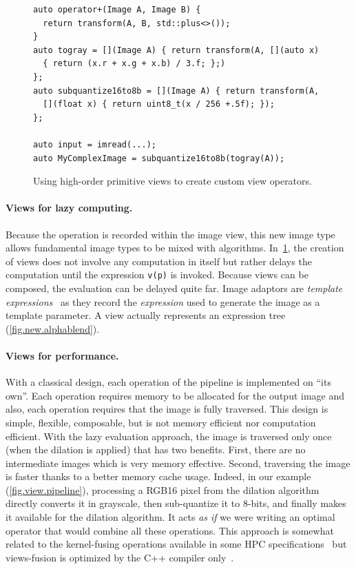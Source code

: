 \begin{figure}
  \begin{verbatim}
auto operator+(Image A, Image B) {
  return transform(A, B, std::plus<>());
}
auto togray = [](Image A) { return transform(A, [](auto x)
  { return (x.r + x.g + x.b) / 3.f; };)
};
auto subquantize16to8b = [](Image A) { return transform(A,
  [](float x) { return uint8_t(x / 256 +.5f); });
};

auto input = imread(...);
auto MyComplexImage = subquantize16to8b(togray(A));
  \end{verbatim}

  \caption{Using high-order primitive views to create custom view operators.}
  \label{fig.view.highorder}
\end{figure}

\paragraph{Views for lazy computing.} Because the operation is recorded within the image view, this new image type
allows fundamental image types to be mixed with algorithms. In~\cref{fig.view.highorder}, the creation of views does not
involve any computation in itself but rather delays the computation until the expression \texttt{v(p)} is invoked.
Because views can be composed, the evaluation can be delayed quite far. Image adaptors are \emph{template
  expressions}~\parencite{veldhuizen.1995.expression, veldhuizen.2000.blitz} as they record the \emph{expression} used to
generate the image as a template parameter. A view actually represents an expression tree (\cref{fig.new.alphablend}).

\paragraph{Views for performance.} With a classical design, each operation of the pipeline is implemented on ``its
own''. Each operation requires memory to be allocated for the output image and also, each operation requires that the
image is fully traversed. This design is simple, flexible, composable, but is not memory efficient nor computation
efficient. With the lazy evaluation approach, the image is traversed only once (when the dilation is applied) that has
two benefits. First, there are no intermediate images which is very memory effective. Second, traversing the image is
faster thanks to a better memory cache usage. Indeed, in our example (\cref{fig.view.pipeline}), processing a RGB16
pixel from the dilation algorithm directly converts it in grayscale, then sub-quantize it to 8-bits, and finally makes
it available for the dilation algorithm. It acts \emph{as if} we were writing an optimal operator that would combine all
these operations. This approach is somewhat related to the kernel-fusing operations available in some HPC
specifications~\parencite{openvx.2019} but views-fusion is optimized by the C++ compiler
only~\parencite{brown.2018.ranges}.

